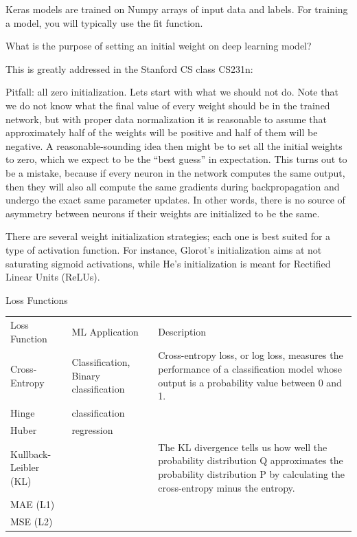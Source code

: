 Keras models are trained on Numpy arrays of input data and labels. For training a model, you will typically use the fit function. 






What is the purpose of setting an initial weight on deep learning model?

This is greatly addressed in the Stanford CS class CS231n:

Pitfall: all zero initialization. Lets start with what we should not do. Note that we do not know what the final value of every weight should be in the trained network, but with proper data normalization it is reasonable to assume that approximately half of the weights will be positive and half of them will be negative. A reasonable-sounding idea then might be to set all the initial weights to zero, which we expect to be the “best guess” in expectation. This turns out to be a mistake, because if every neuron in the network computes the same output, then they will also all compute the same gradients during backpropagation and undergo the exact same parameter updates. In other words, there is no source of asymmetry between neurons if their weights are initialized to be the same.

There are several weight initialization strategies; each one is best suited for a type of activation function. For instance, Glorot's initialization aims at not saturating sigmoid activations, while He's initialization is meant for Rectified Linear Units (ReLUs).

Loss Functions

\begin{tabular}{ l l l }
Loss Function &	ML Application &	Description \\
Cross-Entropy&	Classification,
Binary classification &	Cross-entropy loss, or log loss, measures the performance of a classification model whose output is a probability value between 0 and 1.\\
Hinge &	classification	& &\\
Huber &	regression		& &\\
Kullback-Leibler (KL)	& &	The KL divergence tells us how well the probability distribution Q approximates the probability distribution P by calculating the cross-entropy minus the entropy. \\
MAE (L1) &&\\		
MSE (L2)	&&\\		
\end{tabular}